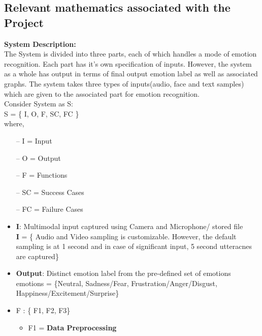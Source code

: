 \documentclass[oneside,a4paper,12pt]{report}
\begin{document}
\begin{normalsize}
\newpage
\section{Relevant mathematics associated with the Project}
\label{sec:math}
\begin{flushleft}
\textbf{System Description:}\\
The System is divided into three parts, each of which handles a mode of emotion recognition. Each part has it's own specification of inputs. However, the system as a whole has output in terms of final output emotion label as well as associated graphs. The system takes three types of inputs(audio, face and text samples) which are given to the associated part for emotion recognition.\\
\vspace{5mm}
Consider System as S:\\
S = \{ I, O, F, SC, FC \}\\
where,
\end{flushleft}
\begin{itemize}
	\item[--]I = Input
	\item[--]O = Output
	\item[--]F = Functions
	\item[--]SC = Success Cases
	\item[--]FC = Failure Cases
\end{itemize}
\vspace{5mm}
\begin{itemize}
\item \textbf{I}: Multimodal input captured using Camera and Microphone/ stored file\\
\vspace{3mm}
\textbf{I} = \{ Audio and Video sampling is customizable. However, the default sampling is at 1 second and in case of significant input, 5 second utteracnes are captured\}
\vspace{3mm}
\item \textbf{Output}: Distinct emotion label from the pre-defined set of emotions\\emotions = \{Neutral, Sadness/Fear, Frustration/Anger/Disgust, Happiness/Excitement/Surprise\}
\newpage
\item F : \{ F1, F2, F3\}\\
\vspace{2mm}
\begin{itemize}
	\item F1  =  \textbf{Data Preprocessing}\\

\end{itemize}
\end{itemize}
\end{normalsize}
\end{document}
